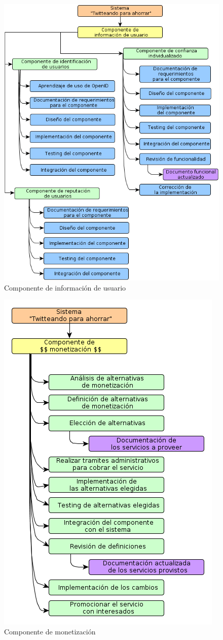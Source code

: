 \begin{figure}[H]
\centering
\includegraphics[scale=\escaladefault]{graficos/wbs/comp_de_info_de_usuario.png}
\caption{Componente de información de usuario}
\end{figure}

\begin{figure}[H]
\centering
\includegraphics[scale=\escaladefault]{graficos/wbs/comp_monetizacion.png}
\caption{Componente de monetización}
\end{figure}

